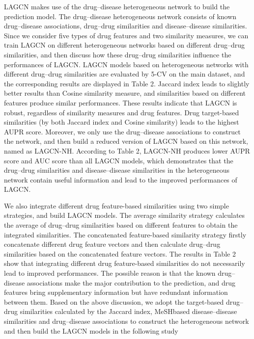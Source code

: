 \documentclass[fleqn,10pt]{wlscirep}
\begin{document}
LAGCN makes use of the drug–disease heterogeneous network to build the prediction model. The drug–disease heterogeneous network consists of known drug–disease associations, drug–drug similarities and disease–disease similarities. Since we consider five types of drug features and two similarity measures, we can train LAGCN on different heterogeneous networks based on different drug–drug similarities, and then discuss how these drug–drug similarities influence the performances of LAGCN.
LAGCN models based on heterogeneous networks with different drug–drug similarities are evaluated by 5-CV on the main dataset, and the corresponding results are displayed in Table 2.
Jaccard index leads to slightly better results than Cosine similarity measure, and similarities based on different features produce similar performances. These results indicate that LAGCN is robust, regardless of similarity measures and drug features. Drug target-based similarities (by both Jaccard index and Cosine similarity) leads to the highest AUPR score. Moreover, we only use the drug–disease associations to construct the network, and then build a reduced version of LAGCN based on this network, named as LAGCN-NH. According to Table 2, LAGCN-NH produces lower AUPR score and AUC score than all LAGCN models, which demonstrates that the drug–drug similarities and disease–disease similarities in the heterogeneous network contain useful information and lead to the improved performances of LAGCN.

We also integrate different drug feature-based similarities using two simple strategies, and build LAGCN models. The average similarity strategy calculates the average of drug–drug similarities based on different features to obtain the integrated similarities. The concatenated feature-based similarity strategy firstly concatenate different drug feature vectors and then calculate drug–drug similarities based on the concatenated feature vectors. The results in Table 2 show that integrating different drug feature-based similarities do not necessarily lead to improved performances. The possible reason is that the known drug–disease associations make the major contribution to the prediction, and drug features bring supplementary information but have redundant information between them. Based on the above discussion, we adopt the target-based drug–drug similarities calculated by the Jaccard index, MeSHbased disease–disease similarities and drug–disease associations to construct the heterogeneous network and then build the LAGCN models in the following study
\end{document}
